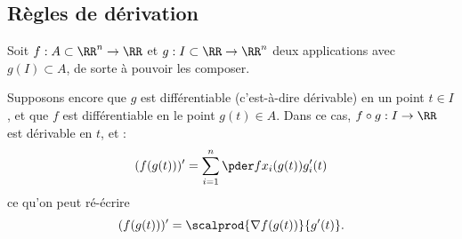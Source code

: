 \subsection{Règles de dérivation}
\label{sec:regles-de-derivation}
\begin{frame}
  \begin{proposition}
    Soit \(f : A \subset \RR^{n} \to \RR\) et \(g : I \subset \RR \to \RR^{n}\) deux applications avec \(g(I)\subset A\), de sorte à pouvoir les composer.\pause{}

    Supposons encore que \(g\) est différentiable (c'est-à-dire dérivable) en un point \(t \in I\)\pause{}, et que \(f\) est différentiable en le point \(g(t) \in A\).\pause{} Dans ce cas, \(f \circ g : I\to\RR\) est dérivable en \(t\), et :\pause{}
    \begin{equation*}
      (f(g(t)))' = \sum_{i=1}^{n}\pder f{x_{i}}(g(t)) g_{i}'(t)
    \end{equation*}\pause{}
    ce qu'on peut ré-écrire\pause{}
    \begin{equation*}
      (f(g(t)))'  = \scalprod{\nabla f(g(t))} {g'(t)}.
    \end{equation*}
  \end{proposition}
\end{frame}
